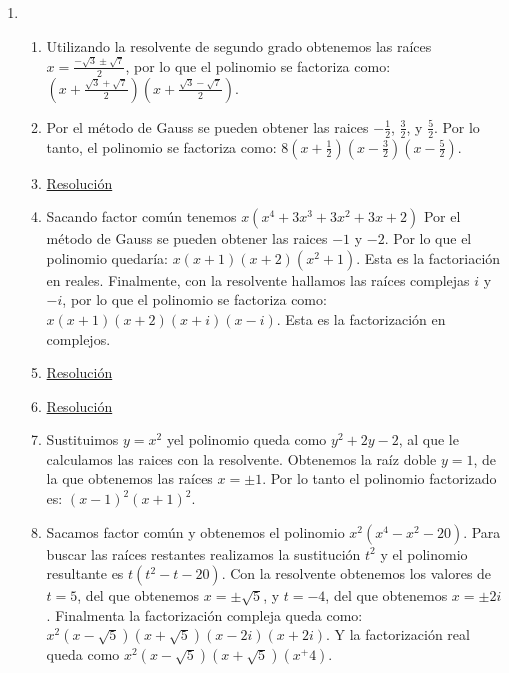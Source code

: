 \documentclass[a4paper]{article}
\newcommand{\exercise}{\item}
\newcommand{\df}[2]{\displaystyle\frac{#1}{#2}}
\begin{document}
\begin{enumerate}
\begin{enumerate} [label=(\alph*)]
		\item $Q(\gamma)=2 \gamma^2-4\gamma = (4)-1= P(4)$ por lo que obtenemos la ecuación $2 \gamma^2-4\gamma -3 = 0$, de donde despejamos los valores de $\gamma = 1 \pm \sqrt{\df{5}{2}}$.
		\item $\gamma=-7$. \href{https://youtu.be/09D5Z3dcaXc}{Resolución}
		\item $\alpha=6$ y $\beta=6$. \href{https://youtu.be/jE5a43IQ91E}{Resolución}
\end{enumerate}\exercise\begin{enumerate} [label=(\alph*)]		\item Utilizando la resolvente de segundo grado obtenemos las raíces $x=\df{-\sqrt{3}\pm\sqrt{7}}{2}$, por lo que el polinomio se factoriza como: $\left(x+\df{\sqrt{3}+\sqrt{7}}{2}\right)\left(x+\df{\sqrt{3}-\sqrt{7}}{2}\right)$.
		\item Por el método de Gauss se pueden obtener las raices $-\df{1}{2}$, $\df{3}{2}$, y $\df{5}{2}$. Por lo tanto, el polinomio se factoriza como: $8\left(x+\df{1}{2}\right)\left(x-\df{3}{2}\right)\left(x-\df{5}{2}\right)$.
		\item \href{https://youtu.be/ZMBXAdxOleM}{Resolución}
		\item Sacando factor común tenemos $x(x^4+3x^3+3x^2+3x+2)$ Por el método de Gauss se pueden obtener las raices $-1$ y $-2$. Por lo que el polinomio quedaría: $x(x+1)(x+2)(x^2+1)$. Esta es la factoriación en reales. Finalmente, con la resolvente hallamos las raíces complejas $i$ y $-i$, por lo que el polinomio se factoriza como: $x(x+1)(x+2)(x+i)(x-i)$. Esta es la factorización en complejos.
		\item \href{https://youtu.be/1V06bnuaadA}{Resolución}
		\item \href{https://youtu.be/Z1KatpJM2eU}{Resolución}
		\item Sustituimos $y=x^2$ yel polinomio queda como $y^2+2y-2$, al que le calculamos las raices con la resolvente. Obtenemos la raíz doble $y=1$, de la que obtenemos las raíces $x=\pm1$. Por lo tanto el polinomio factorizado es: $(x-1)^2(x+1)^2$. 
		\item Sacamos factor común y obtenemos el polinomio $x^2(x^4-x^2-20)$. Para buscar las raíces restantes realizamos la sustitución $t^2$ y el polinomio resultante es $t(t^2-t-20)$. Con la resolvente obtenemos los valores de $t=5$, del que obtenemos $x=\pm \sqrt{5}$, y $t=-4$, del que obtenemos $x=\pm2i$. Finalmenta la factorización compleja queda como: $x^2(x-\sqrt{5})(x+\sqrt{5})(x-2i)(x+2i)$. Y la factorización real queda como $x^2(x-\sqrt{5})(x+\sqrt{5})(x^+4)$.

\end{enumerate}
\end{enumerate}
\end{document}
